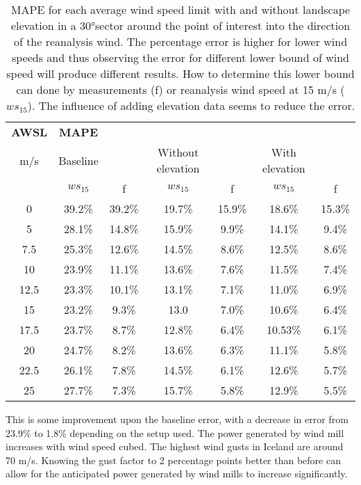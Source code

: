 \begin{table}[h]
    \caption[Model results for different AWSL]{MAPE for each average wind speed limit with and without landscape elevation in a 30°sector around the point of interest into the direction of the reanalysis wind. The percentage error is higher for lower wind speeds and thus observing the error for different lower bound of wind speed will produce different results. How to determine this lower bound can done by measurements (f) or reanalysis wind speed at 15 m/s ($ws_{15}$). The influence of adding elevation data seems to reduce the error.}
    \label{table:results}
    \centering
    \begin{tabular}{c|cccccc}
        \textbf{AWSL} & \textbf{MAPE} & & & & &\\ 
        m/s & Baseline & &  Without elevation & & With elevation & \\
            & $ws_{15}$ & f & $ws_{15}$ & f & $ws_{15}$ & f\\\hline
        0 & 39.2\% & 39.2\% & 19.7\% & 15.9\% & 18.6\% & 15.3\%\\
        5 & 28.1\% & 14.8\% & 15.9\% & 9.9\% & 14.1\% & 9.4\%\\
        7.5 & 25.3\% & 12.6\% & 14.5\% & 8.6\% & 12.5\% & 8.6\%\\
        10 & 23.9\% & 11.1\%& 13.6\% & 7.6\% & 11.5\% & 7.4\%\\
        12.5 & 23.3\% & 10.1\% & 13.1\% & 7.1\% & 11.0\% & 6.9\%\\
        15 & 23.2\% & 9.3\% & 13.0 & 7.0\% & 10.6\% & 6.4\%\\
        17.5 & 23.7\% & 8.7\% & 12.8\% & 6.4\% & 10.53\% & 6.1\%\\
        20 & 24.7\% & 8.2\% & 13.6\% & 6.3\% & 11.1\% & 5.8\%\\
        22.5 & 26.1\% & 7.8\% & 14.5\% & 6.1\% & 12.6\% & 5.7\%\\
        25 & 27.7\% & 7.3\% & 15.7\% & 5.8\% & 12.9\% & 5.5\% \\
    \end{tabular}
\end{table}

This is some improvement upon the baseline error, with a decrease in error from 23.9\% to 1.8\% depending on the setup used. The power generated by wind mill increases with wind speed cubed\cite{wind_power}. The highest wind gusts in Iceland are around 70 m/s. Knowing the gust factor to 2 percentage points better than before can allow for the anticipated power generated by wind mills to increase significantly.

